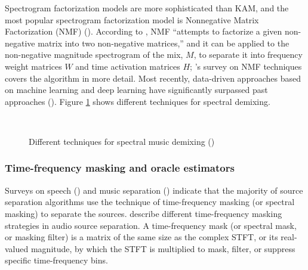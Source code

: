 \documentclass[report.tex]{subfiles}
\begin{document}
Spectrogram factorization models are more sophisticated than KAM, and the most popular spectrogram factorization model is Nonnegative Matrix Factorization (NMF) (\cite{musicsepsurvey, musicsepgood}). According to \textcite{musicsepgood}, NMF ``attempts to factorize a given non-negative matrix into two non-negative matrices,'' and it can be applied to the non-negative magnitude spectrogram of the mix, $M$, to separate it into frequency weight matrices $W$ and time activation matrices $H$; \textcite{nmfpaper}'s survey on NMF techniques covers the algorithm in more detail. Most recently, data-driven approaches based on machine learning and deep learning have significantly surpassed past approaches (\cite{musicsepgood, sisec2018}). Figure \ref{fig:spectraldemix} shows different techniques for spectral demixing.

\begin{figure}[ht]
	\centering
	\\
	\caption{Different techniques for spectral music demixing (\cite{musicsepgood})}
	\label{fig:spectraldemix}
\end{figure}

\newpagefill

\subsubsection{Time-frequency masking and oracle estimators}
\label{sec:masksandoracles}

Surveys on speech (\cite{speechmask}) and music separation (\cite{musicmask}) indicate that the majority of source separation algorithms use the technique of time-frequency masking (or spectral masking) to separate the sources.  \textcite{masking} describe different time-frequency masking strategies in audio source separation. A time-frequency mask (or spectral mask, or masking filter) is a matrix of the same size as the complex STFT, or its real-valued magnitude, by which the STFT is multiplied to mask, filter, or suppress specific time-frequency bins.
\end{document}
